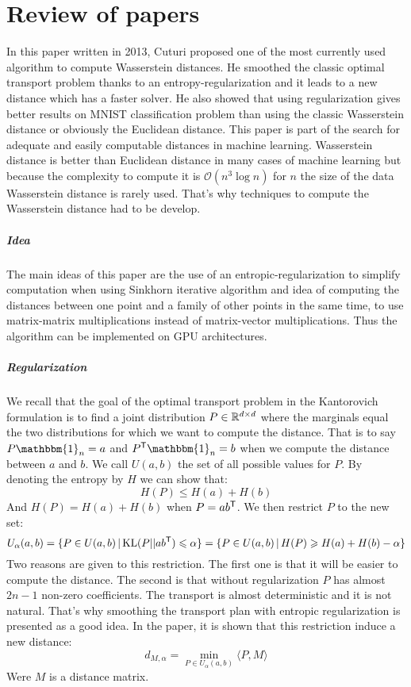 \chapter{Review of papers}

\myminitoc


In this paper written in 2013, Cuturi proposed one of the most currently used algorithm to compute Wasserstein distances. He smoothed the classic optimal transport problem thanks to an entropy-regularization and it leads to a new distance which has a faster solver. He also showed that using regularization gives better results on MNIST classification problem than using the classic Wasserstein distance or obviously the Euclidean distance. This paper is part of the search for adequate and easily computable distances in machine learning. Wasserstein distance is better than Euclidean distance in many cases of machine learning but because the complexity to compute it is $\mathcal{O}(n^3 \log n)$ for $n$ the size of the data Wasserstein distance is rarely used. That's why techniques to compute the Wasserstein distance had to be develop.

\paragraph{Idea}
The main ideas of this paper are the use of an entropic-regularization to simplify computation when using Sinkhorn iterative algorithm and idea of computing the distances between one point and a family of other points in the same time, to use matrix-matrix multiplications instead of matrix-vector multiplications. Thus the algorithm can be implemented on GPU architectures.

\paragraph{Regularization}
We recall that the goal of the optimal transport problem in the Kantorovich formulation is to find a joint distribution $P \in \mathbb{R}^{d \times d}$ where the marginals equal the two distributions for which we want to compute the distance. That is to say $P \mathbbm{1}_n = a$ and $P^\trans \mathbbm{1}_n = b$ when we compute the distance between $a$ and $b$. We call $U(a, b)$ the set of all possible values for $P$. By denoting the entropy by $H$ we can show that:
$$ H(P) \leqslant H(a) + H(b) $$
And $H(P) = H(a) + H(b)$ when $P = a b^{\mathsf{T}}$. We then restrict $P$ to the new set:
$$ U_\alpha(a, b) = \{ P \in U(a, b) \, | \, \text{KL}(P || a b^{\mathsf{T}}) \leqslant \alpha \} = \{ P \in U(a, b) \, | \, H(P) \geqslant H(a) + H(b) - \alpha \} $$
Two reasons are given to this restriction. The first one is that it will be easier to compute the distance. The second is that without regularization $P$ has almost $2n-1$ non-zero coefficients. The transport is almost deterministic and it is not natural. That's why smoothing the transport plan with entropic regularization is presented as a good idea. In the paper, it is shown that this restriction induce a new distance:
$$ d_{M, \alpha} = \min_{P \in U_\alpha(a, b)} \langle P, M \rangle $$
Were $M$ is a distance matrix.

